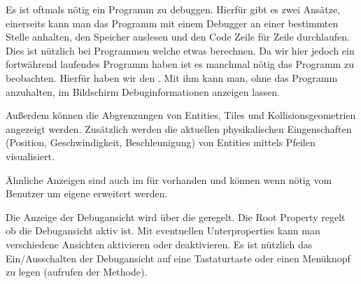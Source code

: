 Es ist oftmals nötig ein Programm zu debuggen. Hierfür gibt es zwei Ansätze, einerseits kann man das Programm mit einem Debugger an einer bestimmten Stelle anhalten, den Speicher auslesen und den Code Zeile für Zeile durchlaufen.
Dies ist nützlich bei Programmen welche etwas berechnen. Da wir hier jedoch ein fortwährend laufendes Programm haben ist es manchmal nötig das Programm  zu beobachten. Hierfür haben wir den . Mit ihm kann man, ohne das Programm anzuhalten, im Bildschirm Debuginformationen anzeigen lassen.


Außerdem können die Abgrenzungen von Entities, Tiles und Kollisionsgeometrien angezeigt werden. Zusätzlich werden die aktuellen physikalischen Eingenschaften (Position, Geschwindigkeit, Beschleunigung) von Entities mittels Pfeilen visualisiert.

Ähnliche Anzeigen sind auch im  für  vorhanden und können wenn nötig vom Benutzer um eigene erweitert werden.


Die Anzeige der Debugansicht wird über die  geregelt. Die Root Property  regelt ob die Debugansicht aktiv ist. Mit eventuellen Unterproperties kann man verschiedene Ansichten aktivieren oder deaktivieren. Es ist nützlich das Ein/Ausschalten der Debugansicht auf eine Tastaturtaste oder einen Menüknopf zu legen (aufrufen der  Methode).